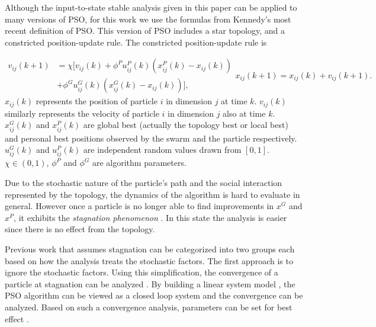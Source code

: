 \documentclass{sig-alternate}
\begin{document}
Although the input-to-state stable analysis given in this paper can be applied to many versions of PSO,
for this work we use the formulas from Kennedy's most recent definition of PSO\cite{4223164}.
This version of PSO includes a star topology, and a constricted position-update rule. 
The constricted position-update rule is

\begin{subequations}
\label{eq:pso_alg}
\begin{equation}
\label{eq:up_vel}
\begin{aligned}
v_{ij}(k+1) & = \chi [ v_{ij}(k) 
+ \phi^{P} u^{P}_{ij}(k) (x^{P}_{ij}(k) - x_{ij}(k))
\\ & + \phi^{G} u^{G}_{ij}(k) ( x^{G}_{ij}(k) - x_{ij}(k)) ],
\end{aligned}
\end{equation}
\begin{equation}
\label{eq:up_pos}
x_{ij}(k+1) = x_{ij}(k) + v_{ij}(k+1).
\end{equation}
\end{subequations}
$ x_{ij}(k) $ represents the position of particle $ i $ in dimension $ j $ at time $ k $.
$ v_{ij}(k) $ similarly represents the velocity of particle $ i $ in dimension $ j $ also at time $ k $.
$ x^{G}_{ij}(k) $ and $ x^{P}_{ij}(k) $ are global best (actually the topology best or local best) and personal best positions observed by the swarm and the particle respectively. 
$ u^{G}_{ij}(k) $ and $ u^{P}_{ij}(k) $ are independent random values drawn from $ [0,1] $.
$ \chi \in ( 0, 1 ) $, $ \phi^{P} $ and $ \phi^{G} $ are algorithm parameters.

Due to the stochastic nature of the particle's path and the social interaction represented by the topology, the dynamics of the algorithm is hard to evaluate in general.
However once a particle is no longer able to find improvements in $ x^{G} $ and $ x^{P} $, it exhibits the \emph{stagnation phenomenon} \cite{Clerc06stagnationanalysis}.
In this state the analysis is easier since there is no effect from the topology.

Previous work that assumes stagnation can be categorized into two groups each based on how the analysis treats the stochastic factors.
The first approach is to ignore the stochastic factors.
Using this simplification, the convergence of a particle at stagnation can be analyzed \cite{985692}. 
By building a linear system model \cite{4424687}, the PSO algorithm can be viewed as a closed loop system and the convergence can be analyzed.
Based on such a convergence analysis, parameters can be set for best effect \cite{Trelea2003317}.
\end{document}
